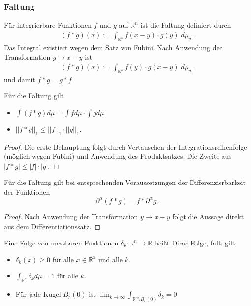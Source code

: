 \subsubsection{Faltung}
\begin{Definition}
Für integrierbare Funktionen  $f$ und $g$ auf $\mathbb{R}^n$ ist die Faltung definiert durch
\begin{align}
(f * g )(x) := \int_{\mathbb{R}^n}  f(x- y) \cdot g(y) \; d \mu_y  \; .
\end{align}
Das Integral existiert wegen dem Satz von Fubini.  Nach Anwendung der Transformation $y \to x -y$  ist  
\begin{align}
(f * g )(x) := \int_{\mathbb{R}^n}  f(y) \cdot g(x-y) \; d \mu_y  \; .
\end{align}
und damit $f*g = g*f$
\end{Definition}


\begin{Satz}
Für die Faltung gilt
\begin{itemize}
\item $ \int (f * g) d \mu = \int f d \mu \cdot \int g d \mu$.
\item $||f *g ||_1 \leq ||f||_1 \cdot ||g||_1$.
\end{itemize}
\end{Satz}
\begin{proof}
Die erste Behauptung folgt durch Vertauschen der Integrationsreihenfolge (möglich wegen Fubini) und Anwendung des Produktsatzes.
Die Zweite aus $| f*g| \leq |f| \cdot |g|$.
\end{proof}


\begin{Satz}
Für die Faltung gilt bei entsprechenden Voraussetzungen der Differenzierbarkeit der Funktionen 
$$ \partial^{\alpha} (f  * g) = f * \partial^{\alpha} g \; .$$
\end{Satz}
\begin{proof}
Nach Anwendung der Transformation $y \to x -y$ folgt die Aussage direkt aus dem Differentiationssatz.
\end{proof}

\begin{Definition}
Eine Folge von messbaren Funktionen $\delta_k : \mathbb{R}^n \to \mathbb{R}$ heißt Dirac-Folge, falls gilt:
\begin{itemize}
\item $\delta_k (x) \geq 0$ für alle $x \in \mathbb {R}^n$ und alle $k$.
\item $\int_{\mathbb{R}^n} \delta_k d \mu = 1$ für alle $k$.
\item Für jede Kugel $B_r(0)$ ist $\lim_{k \to \infty} \int_{\mathbb{R}^n \setminus B_r(0)} \delta_k = 0$
\end{itemize}
\end{Definition}


